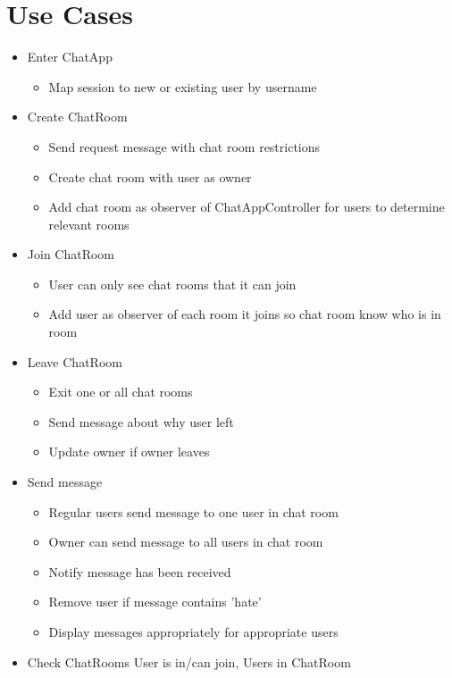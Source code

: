 \documentclass[letterpaper, 11pt]{article}
\begin{document}
\section{Use Cases}
\begin{itemize}
  \item Enter ChatApp
  \begin{itemize}
    \item Map session to new or existing user by username
  \end{itemize}
  \item Create ChatRoom
  \begin{itemize}
    \item Send request message with chat room restrictions
    \item Create chat room with user as owner
    \item Add chat room as observer of ChatAppController for users to determine relevant rooms
  \end{itemize}
  \item Join ChatRoom
  \begin{itemize}
    \item User can only see chat rooms that it can join
    \item Add user as observer of each room it joins so chat room know who is in room
  \end{itemize}
  \item Leave ChatRoom
  \begin{itemize}
    \item Exit one or all chat rooms
    \item Send message about why user left
    \item Update owner if owner leaves
  \end{itemize}
  \item Send message
  \begin{itemize}
    \item Regular users send message to one user in chat room
    \item Owner can send message to all users in chat room
    \item Notify message has been received
    \item Remove user if message contains 'hate'
    \item Display messages appropriately for appropriate users
  \end{itemize}
  \item Check ChatRooms User is in/can join, Users in ChatRoom
\end{itemize}
\end{document}
